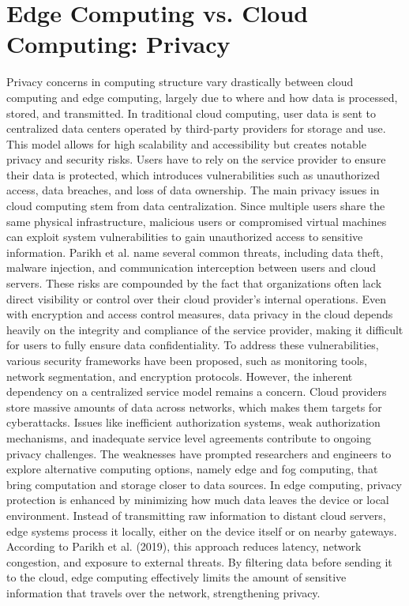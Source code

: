 \documentclass[conference]{IEEEtran}
\begin{document}
{\section{Edge Computing vs. Cloud Computing: Privacy}
Privacy concerns in computing structure vary drastically between cloud computing and edge computing, largely due to where and how data is processed, stored, and transmitted. In traditional cloud computing, user data is sent to centralized data centers operated by third-party providers for storage and use. This model allows for high scalability and accessibility but creates notable privacy and security risks. Users have to rely on the service provider to ensure their data is protected, which introduces vulnerabilities such as unauthorized access, data breaches, and loss of data ownership. 
The main privacy issues in cloud computing stem from data centralization. Since multiple users share the same physical infrastructure, malicious users or compromised virtual machines can exploit system vulnerabilities to gain unauthorized access to sensitive information. Parikh et al. name several common threats, including data theft, malware injection, and communication interception between users and cloud servers. These risks are compounded by the fact that organizations often lack direct visibility or control over their cloud provider’s internal operations. Even with encryption and access control measures, data privacy in the cloud depends heavily on the integrity and compliance of the service provider, making it difficult for users to fully ensure data confidentiality.
To address these vulnerabilities, various security frameworks have been proposed, such as monitoring tools, network segmentation, and encryption protocols. However, the inherent dependency on a centralized service model remains a concern. Cloud providers store massive amounts of data across networks, which makes them targets for cyberattacks. Issues like inefficient authorization systems, weak authorization mechanisms, and inadequate service level agreements contribute to ongoing privacy challenges. The weaknesses have prompted researchers and engineers to explore alternative computing options, namely edge and fog computing, that bring computation and storage closer to data sources.
In edge computing, privacy protection is enhanced by minimizing how much data leaves the device or local environment. Instead of transmitting raw information to distant cloud servers, edge systems process it locally, either on the device itself or on nearby gateways. According to Parikh et al. (2019), this approach reduces latency, network congestion, and exposure to external threats. By filtering data before sending it to the cloud, edge computing effectively limits the amount of sensitive information that travels over the network, strengthening privacy. 
}
\end{document}
